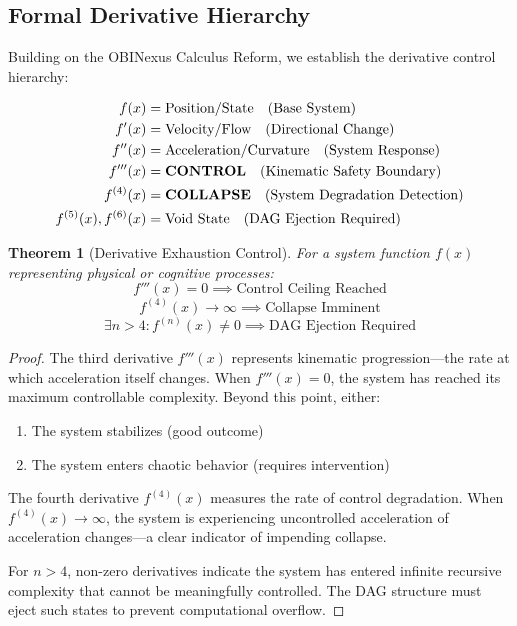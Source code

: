 \documentclass[11pt]{article}
\newtheorem{theorem}{Theorem}
\begin{document}
\subsection{Formal Derivative Hierarchy}

Building on the OBINexus Calculus Reform, we establish the derivative control hierarchy:

\begin{align}
f(x) &= \text{Position/State} \quad \text{(Base System)} \\
f'(x) &= \text{Velocity/Flow} \quad \text{(Directional Change)} \\
f''(x) &= \text{Acceleration/Curvature} \quad \text{(System Response)} \\
f'''(x) &= \text{\textbf{CONTROL}} \quad \text{(Kinematic Safety Boundary)} \\
f^{(4)}(x) &= \text{\textbf{COLLAPSE}} \quad \text{(System Degradation Detection)} \\
f^{(5)}(x), f^{(6)}(x) &= \text{Void State} \quad \text{(DAG Ejection Required)}
\end{align}

\begin{theorem}[Derivative Exhaustion Control]
For a system function $f(x)$ representing physical or cognitive processes:
$$f'''(x) = 0 \implies \text{Control Ceiling Reached}$$
$$f^{(4)}(x) \rightarrow \infty \implies \text{Collapse Imminent}$$
$$\exists n > 4: f^{(n)}(x) \neq 0 \implies \text{DAG Ejection Required}$$
\end{theorem}

\begin{proof}
The third derivative $f'''(x)$ represents kinematic progression—the rate at which acceleration itself changes. When $f'''(x) = 0$, the system has reached its maximum controllable complexity. Beyond this point, either:
\begin{enumerate}
\item The system stabilizes (good outcome)
\item The system enters chaotic behavior (requires intervention)
\end{enumerate}

The fourth derivative $f^{(4)}(x)$ measures the rate of control degradation. When $f^{(4)}(x) \rightarrow \infty$, the system is experiencing uncontrolled acceleration of acceleration changes—a clear indicator of impending collapse.

For $n > 4$, non-zero derivatives indicate the system has entered infinite recursive complexity that cannot be meaningfully controlled. The DAG structure must eject such states to prevent computational overflow.
\end{proof}
\end{document}
